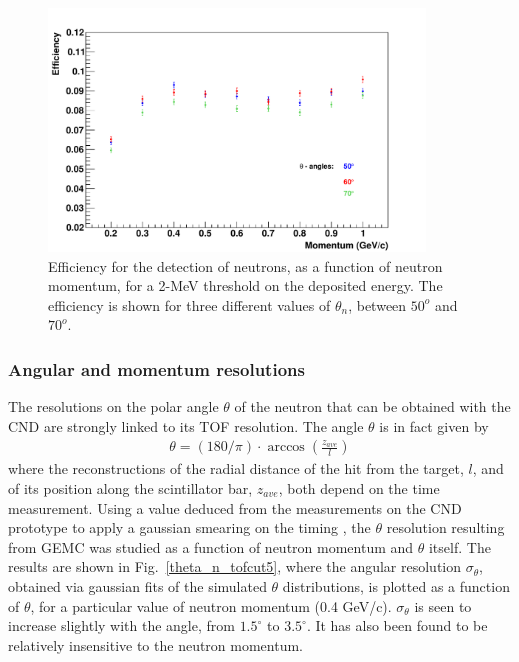 \begin{figure}[t]  
\begin{center}
\includegraphics[width=100mm]{eff_vs_mom_diff_theta_II.pdf}
\caption [Neutron detection efficiency as a function of neutron momentum]
{Efficiency for the detection of neutrons, as a function of neutron momentum, for a 2-MeV threshold on the deposited energy. The efficiency is shown for three different values of $\theta_n$, between $50^o$ and $70^o$.
}
\label{eff_vs_mom}
\end{center}
\end{figure}

\subsubsection{Angular and momentum resolutions}\label{resolution-section}

The resolutions on the polar angle $\theta$ of the neutron that can be obtained with the CND are strongly linked to its TOF resolution. The angle $\theta$ is in fact given by
\begin{eqnarray} 
\theta = (180/\pi)\cdot \arccos (\frac{z_{ave}}{l})
\end{eqnarray}
where the reconstructions of the radial distance of the hit from the target, $l$, and of its position along the scintillator bar, $z_{ave}$,  both depend on the time measurement. Using a value deduced from the measurements on the CND prototype to apply a gaussian smearing on the timing \cite{proposal}, 
the $\theta$ resolution resulting from GEMC was studied as a function of neutron momentum and $\theta$ itself. The results are shown in Fig.~\ref{theta_n_tofcut5}, where the angular resolution $\sigma_\theta$, obtained via gaussian fits of the simulated $\theta$ distributions, is plotted as a function of  $\theta$, for a particular value of neutron momentum (0.4 GeV/c). $\sigma_\theta$ is seen to increase slightly with the angle, from $1.5^{\circ}$ to $3.5^{\circ}$.  It has also been found to be relatively insensitive to the neutron momentum. 


